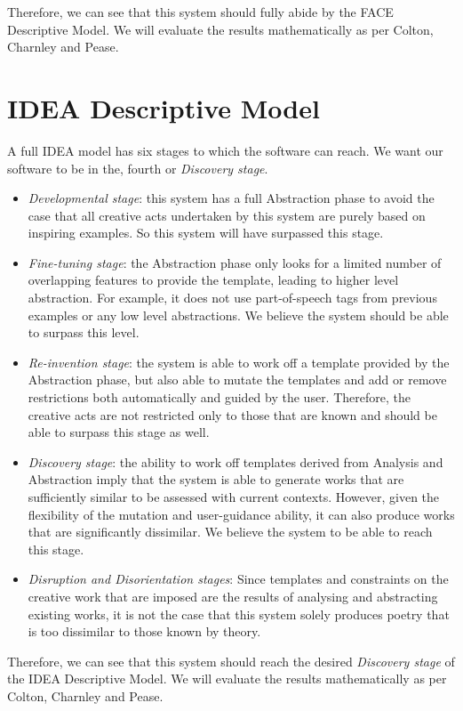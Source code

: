 Therefore, we can see that this system should fully abide by the FACE Descriptive Model. We will evaluate the results mathematically as per Colton, Charnley and Pease.

\section{IDEA Descriptive Model}
\label{sec:idea}
A full IDEA model has six stages to which the software can reach. We want our software to be in the, fourth or \emph{Discovery stage}.

\begin{itemize}
\setlength{\itemsep}{0pt}
\item{\emph{Developmental stage}: this system has a full Abstraction phase to avoid the case that all creative acts undertaken by this system are purely based on inspiring examples. So this system will have surpassed this stage.}
\item{\emph{Fine-tuning stage}: the Abstraction phase only looks for a limited number of overlapping features to provide the template, leading to higher level abstraction. For example, it does not use part-of-speech tags from previous examples or any low level abstractions. We believe the system should be able to surpass this level.}
\item{\emph{Re-invention stage}: the system is able to work off a template provided by the Abstraction phase, but also able to mutate the templates and add or remove restrictions both automatically and guided by the user. Therefore, the creative acts are not restricted only to those that are known and should be able to surpass this stage as well.}
\item{\emph{Discovery stage}: the ability to work off templates derived from Analysis and Abstraction imply that the system is able to generate works that are sufficiently similar to be assessed with current contexts. However, given the flexibility of the mutation and user-guidance ability, it can also produce works that are significantly dissimilar. We believe the system to be able to reach this stage.}
\item{\emph{Disruption and Disorientation stages}: Since templates and constraints on the creative work that are imposed are the results of analysing and abstracting existing works, it is not the case that this system solely produces poetry that is too dissimilar to those known by theory. }
\end{itemize}

Therefore, we can see that this system should reach the desired \emph{Discovery stage} of the IDEA Descriptive Model. We will evaluate the results mathematically as per Colton, Charnley and Pease.



